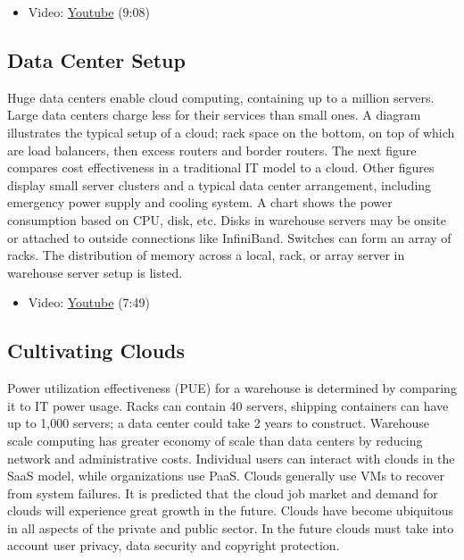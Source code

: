 \begin{itemize}
\tightlist
\item
  Video: \href{https://www.youtube.com/watch?v=cwtWpZcWuQ0}{Youtube}
  (9:08)
\end{itemize}

\subsection{Data Center Setup}\label{data-center-setup}

Huge data centers enable cloud computing, containing up to a million
servers. Large data centers charge less for their services than small
ones. A diagram illustrates the typical setup of a cloud; rack space on
the bottom, on top of which are load balancers, then excess routers and
border routers. The next figure compares cost effectiveness in a
traditional IT model to a cloud. Other figures display small server
clusters and a typical data center arrangement, including emergency
power supply and cooling system. A chart shows the power consumption
based on CPU, disk, etc. Disks in warehouse servers may be onsite or
attached to outside connections like InfiniBand. Switches can form an
array of racks. The distribution of memory across a local, rack, or
array server in warehouse server setup is listed.

\begin{itemize}
\tightlist
\item
  Video: \href{https://www.youtube.com/watch?v=zBVtXzqF2ew}{Youtube}
  (7:49)
\end{itemize}

\subsection{Cultivating Clouds}\label{cultivating-clouds}

Power utilization effectiveness (PUE) for a warehouse is determined by
comparing it to IT power usage. Racks can contain 40 servers, shipping
containers can have up to 1,000 servers; a data center could take 2
years to construct. Warehouse scale computing has greater economy of
scale than data centers by reducing network and administrative costs.
Individual users can interact with clouds in the SaaS model, while
organizations use PaaS. Clouds generally use VMs to recover from system
failures. It is predicted that the cloud job market and demand for
clouds will experience great growth in the future. Clouds have become
ubiquitous in all aspects of the private and public sector. In the
future clouds must take into account user privacy, data security and
copyright protection.

